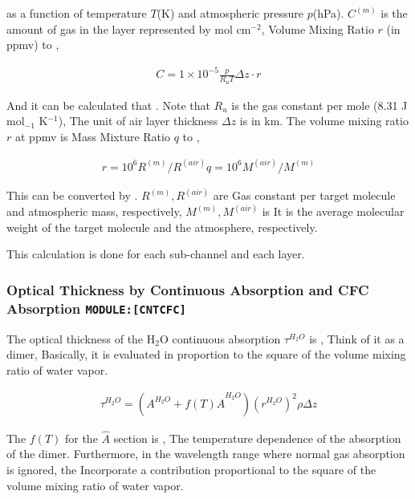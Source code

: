 as a function of temperature \(T\)(K) and atmospheric pressure
\(p\)(hPa). \(C^{(m)}\) is the amount of gas in the layer represented by
mol cm\(^{-2}\), Volume Mixing Ratio \(r\) (in ppmv) to ,

\begin{eqnarray}
  C = 1\times 10^{-5} \frac{p}{R_u T} \Delta z \cdot r
\end{eqnarray}

And it can be calculated that . Note that \(R_u\) is the gas constant
per mole (8.31 J mol\(_{-1}\) K\(^{-1}\)), The unit of air layer
thickness \(\Delta z\) is in km. The volume mixing ratio \(r\) at ppmv
is Mass Mixture Ratio \(q\) to ,

\begin{eqnarray}
  r = 10^6 R^{(m)}/R^{(air)} q = 10^6 M^{(air)}/M^{(m)}
\end{eqnarray}

This can be converted by . \(R^{(m)},R^{(air)}\) are Gas constant per
target molecule and atmospheric mass, respectively,
\(M^{(m)},M^{(air)}\) is It is the average molecular weight of the
target molecule and the atmosphere, respectively.

This calculation is done for each sub-channel and each layer.

\hypertarget{optical-thickness-by-continuous-absorption-and-cfc-absorption-modulecntcfc}{%
\subsubsection{\texorpdfstring{Optical Thickness by Continuous
Absorption and CFC Absorption
\texttt{MODULE:{[}CNTCFC{]}}}{Optical Thickness by Continuous Absorption and CFC Absorption MODULE:{[}CNTCFC{]}}}\label{optical-thickness-by-continuous-absorption-and-cfc-absorption-modulecntcfc}}

The optical thickness of the H\(_2\)O continuous absorption
\(\tau^{H_2O}\) is , Think of it as a dimer, Basically, it is evaluated
in proportion to the square of the volume mixing ratio of water vapor.

\begin{eqnarray}
\tau^{H_2O} = ( A^{H_2O} + f(T) \hat{A}^{H_2O} ) (r^{H_2O})^2 \rho \Delta z
\end{eqnarray}

The \(f(T)\) for the \(\hat{A}\) section is , The temperature dependence
of the absorption of the dimer. Furthermore, in the wavelength range
where normal gas absorption is ignored, the Incorporate a contribution
proportional to the square of the volume mixing ratio of water vapor.

